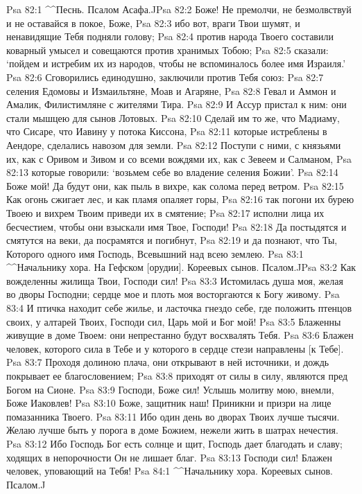 Psa 82:1  ^^Песнь. Псалом Асафа.^^
Psa 82:2  Боже! Не премолчи, не безмолвствуй и не оставайся в покое, Боже,
Psa 82:3  ибо вот, враги Твои шумят, и ненавидящие Тебя подняли голову;
Psa 82:4  против народа Твоего составили коварный умысел и совещаются против хранимых Тобою;
Psa 82:5  сказали: `пойдем и истребим их из народов, чтобы не вспоминалось более имя Израиля.'
Psa 82:6  Сговорились единодушно, заключили против Тебя союз:
Psa 82:7  селения Едомовы и Измаильтяне, Моав и Агаряне,
Psa 82:8  Гевал и Аммон и Амалик, Филистимляне с жителями Тира.
Psa 82:9  И Ассур пристал к ним: они стали мышцею для сынов Лотовых.
Psa 82:10  Сделай им то же, что Мадиаму, что Сисаре, что Иавину у потока Киссона,
Psa 82:11  которые истреблены в Аендоре, сделались навозом для земли.
Psa 82:12  Поступи с ними, с князьями их, как с Оривом и Зивом и со всеми вождями их, как с Зевеем и Салманом,
Psa 82:13  которые говорили: `возьмем себе во владение селения Божии'.
Psa 82:14  Боже мой! Да будут они, как пыль в вихре, как солома перед ветром.
Psa 82:15  Как огонь сжигает лес, и как пламя опаляет горы,
Psa 82:16  так погони их бурею Твоею и вихрем Твоим приведи их в смятение;
Psa 82:17  исполни лица их бесчестием, чтобы они взыскали имя Твое, Господи!
Psa 82:18  Да постыдятся и смятутся на веки, да посрамятся и погибнут,
Psa 82:19  и да познают, что Ты, Которого одного имя Господь, Всевышний над всею землею.
Psa 83:1  ^^Начальнику хора. На Гефском [орудии]. Кореевых сынов. Псалом.^^
Psa 83:2  Как вожделенны жилища Твои, Господи сил!
Psa 83:3  Истомилась душа моя, желая во дворы Господни; сердце мое и плоть моя восторгаются к Богу живому.
Psa 83:4  И птичка находит себе жилье, и ласточка гнездо себе, где положить птенцов своих, у алтарей Твоих, Господи сил, Царь мой и Бог мой!
Psa 83:5  Блаженны живущие в доме Твоем: они непрестанно будут восхвалять Тебя.
Psa 83:6  Блажен человек, которого сила в Тебе и у которого в сердце стези направлены [к Тебе].
Psa 83:7  Проходя долиною плача, они открывают в ней источники, и дождь покрывает ее благословением;
Psa 83:8  приходят от силы в силу, являются пред Богом на Сионе.
Psa 83:9  Господи, Боже сил! Услышь молитву мою, внемли, Боже Иаковлев!
Psa 83:10  Боже, защитник наш! Приникни и призри на лице помазанника Твоего.
Psa 83:11  Ибо один день во дворах Твоих лучше тысячи. Желаю лучше быть у порога в доме Божием, нежели жить в шатрах нечестия.
Psa 83:12  Ибо Господь Бог есть солнце и щит, Господь дает благодать и славу; ходящих в непорочности Он не лишает благ.
Psa 83:13  Господи сил! Блажен человек, уповающий на Тебя!
Psa 84:1  ^^Начальнику хора. Кореевых сынов. Псалом.^^
